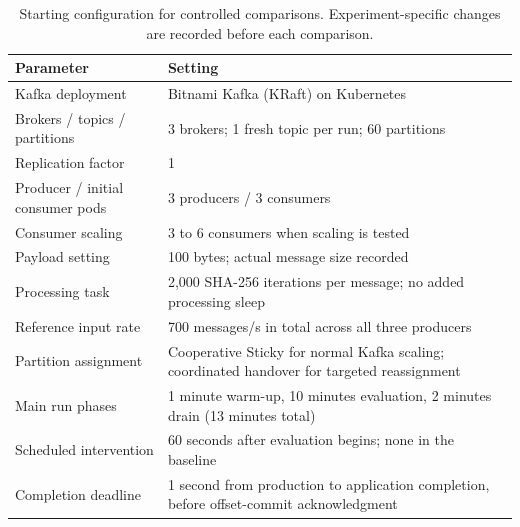 \begin{table}[!htbp]
\centering\small
\caption{Starting configuration for controlled comparisons. Experiment-specific changes are recorded before each comparison.}
\label{tab:config}
\begin{tabularx}{\linewidth}{@{}lX@{}}
\toprule
Parameter & Setting\\\midrule
Kafka deployment & Bitnami Kafka (KRaft) on Kubernetes\\
Brokers / topics / partitions & 3 brokers; 1 fresh topic per run; 60 partitions\\
Replication factor & 1\\
Producer / initial consumer pods & 3 producers / 3 consumers\\
Consumer scaling & 3 to 6 consumers when scaling is tested\\
Payload setting & 100 bytes; actual message size recorded\\
Processing task & 2,000 SHA-256 iterations per message; no added processing sleep\\
Reference input rate & 700 messages/s in total across all three producers\\
Partition assignment & Cooperative Sticky for normal Kafka scaling; coordinated handover for targeted reassignment\\
Main run phases & 1 minute warm-up, 10 minutes evaluation, 2 minutes drain (13 minutes total)\\
Scheduled intervention & 60 seconds after evaluation begins; none in the baseline\\
Completion deadline & 1 second from production to application completion, before offset-commit acknowledgment\\
\bottomrule
\end{tabularx}
\end{table}
